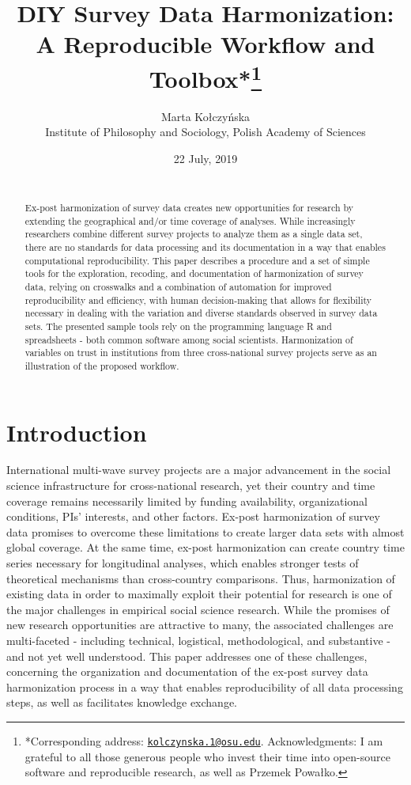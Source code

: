 \documentclass[12pt,]{article}
\title{\vspace{1cm}DIY Survey Data Harmonization: A Reproducible Workflow and Toolbox*\footnote{*Corresponding address: \href{mailto:kolczynska.1@osu.edu}{\nolinkurl{kolczynska.1@osu.edu}}. Acknowledgments: I am grateful to all those generous people who invest their time into open-source software and reproducible research, as well as Przemek Powałko.}\vspace{0.5cm}\\}
\author{Marta Kołczyńska\\
Institute of Philosophy and Sociology, Polish Academy of Sciences}
\date{22 July, 2019\\
~\\}
\begin{document}
\maketitle
\begin{abstract}
\noindent{}Ex-post harmonization of survey data creates new opportunities for research by extending the geographical and/or time coverage of analyses. While increasingly researchers combine different survey projects to analyze them as a single data set, there are no standards for data processing and its documentation in a way that enables computational reproducibility. This paper describes a procedure and a set of simple tools for the exploration, recoding, and documentation of harmonization of survey data, relying on crosswalks and a combination of automation for improved reproducibility and efficiency, with human decision-making that allows for flexibility necessary in dealing with the variation and diverse standards observed in survey data sets. The presented sample tools rely on the programming language R and spreadsheets - both common software among social scientists. Harmonization of variables on trust in institutions from three cross-national survey projects serve as an illustration of the proposed workflow.\vspace{.8cm}
\end{abstract}

\clearpage

\renewcommand{\baselinestretch}{0.5}\normalsize
\tableofcontents
\renewcommand{\baselinestretch}{1.5}\normalsize

\clearpage

\parindent 0.5in

\hypertarget{introduction}{%
\section{Introduction}\label{introduction}}

International multi-wave survey projects are a major advancement in the social science infrastructure for cross-national research, yet their country and time coverage remains necessarily limited by funding availability, organizational conditions, PIs' interests, and other factors. Ex-post harmonization of survey data promises to overcome these limitations to create larger data sets with almost global coverage. At the same time, ex-post harmonization can create country time series necessary for longitudinal analyses, which enables stronger tests of theoretical mechanisms than cross-country comparisons. Thus, harmonization of existing data in order to maximally exploit their potential for research is one of the major challenges in empirical social science research. While the promises of new research opportunities are attractive to many, the associated challenges are multi-faceted - including technical, logistical, methodological, and substantive - and not yet well understood. This paper addresses one of these challenges, concerning the organization and documentation of the ex-post survey data harmonization process in a way that enables reproducibility of all data processing steps, as well as facilitates knowledge exchange.
\end{document}
